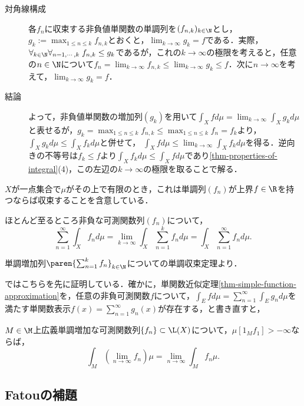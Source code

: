 \documentclass[uplatex, dvipdfmx]{jsreport}
\begin{document}
\begin{Proof}
\begin{description}
        \item[対角線構成]
        各$f_n$に収束する非負値単関数の単調列を$(f_{n,k})_{k\in\N}$とし，$g_k:=\max_{1\le n\le k}f_{n,k}$とおくと，$\lim_{k\to\infty}g_k=f$である．実際，$\forall_{k\in\N}\forall_{n=1,\cdots,k}\;f_{n,k}\le g_k$であるが，これの$k\to\infty$の極限を考えると，任意の$n\in\N$について$f_n=\lim_{k\to\infty}f_{n,k}\le\lim_{k\to\infty}g_k\le f$．次に$n\to\infty$を考えて，$\lim_{k\to\infty}g_k=f$．
        \item[結論]
        よって，非負値単関数の増加列$(g_k)$を用いて$\int_Xfd\mu=\lim_{k\to\infty}\int_Xg_kd\mu$と表せるが，$g_k=\max_{1\le n\le k}f_{n,k}\le\max_{1\le n\le k}f_n=f_k$より，$\int_Xg_kd\mu\le\int_Xf_kd\mu$と併せて，
        $\int_Xfd\mu\le\lim_{k\to\infty}\int_Xf_kd\mu$を得る．逆向きの不等号は$f_k\le f$より$\int_Xf_kd\mu\le\int_Xfd\mu$であり\ref{thm-properties-of-integral}(4)，この左辺の$k\to\infty$の極限を取ることで解る．
    \end{description}
\end{Proof}
\begin{remark}
    $X$が一点集合で$\mu$がその上で有限のとき，これは単調列$(f_n)$が上界$f\in\R$を持つならば収束することを含意している．
\end{remark}

\begin{corollary}
    ほとんど至るところ非負な可測関数列$(f_n)$について，
    \[\sum^\infty_{n=1}\int_Xf_nd\mu=\lim_{k\to\infty}\int_X\sum^k_{n=1}f_nd\mu=\int_X\sum^\infty_{n=1}f_nd\mu.\]
\end{corollary}
\begin{Proof}
    単調増加列$\paren{\sum^k_{n=1}f_n}_{k\in\N}$についての単調収束定理より．
\end{Proof}
\begin{remark}
    \cite{伊藤}ではこちらを先に証明している．確かに，単関数近似定理\ref{thm-simple-function-approximation}を，任意の非負可測関数$f$について，$\int_Efd\mu=\sum^\infty_{n=1}\int_Eg_nd\mu$を満たす単関数表示$f(x)=\sum^\infty_{n=1}g_n(x)$が存在する，と書き直すと，
\end{remark}

\begin{theorem}
    $M\in\M$上広義単調増加な可測関数列$\{f_n\}\subset\L(X)$について，$\mu[1_Mf_1]>-\infty$ならば，
    \[\int_M(\lim_{n\to\infty}f_n)\mu=\lim_{n\to\infty}\int_Mf_n\mu.\]
\end{theorem}

\subsection{Fatouの補題}
\end{document}
